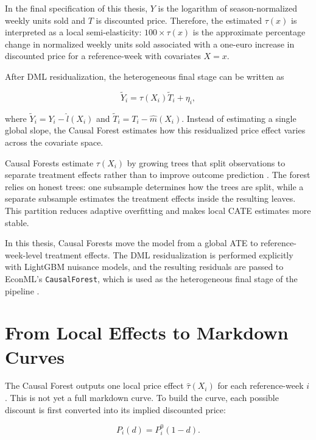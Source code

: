 In the final specification of this thesis, $Y$ is the logarithm of season-normalized weekly units sold and $T$ is discounted price. Therefore, the estimated $\tau(x)$ is interpreted as a local semi-elasticity: $100\times\tau(x)$ is the approximate percentage change in normalized weekly units sold associated with a one-euro increase in discounted price for a reference-week with covariates $X=x$.

After DML residualization, the heterogeneous final stage can be written as

\begin{equation}
\tilde{Y}_i=\tau(X_i)\tilde{T}_i+\eta_i,
\end{equation}

where $\tilde{Y}_i=Y_i-\hat{l}(X_i)$ and $\tilde{T}_i=T_i-\hat{m}(X_i)$. Instead of estimating a single global slope, the Causal Forest estimates how this residualized price effect varies across the covariate space.

Causal Forests estimate $\tau(X_i)$ by growing trees that split observations to separate treatment effects rather than to improve outcome prediction \cite{wager2018hteforest,athey2019causalforests,athey2019grf}. The forest relies on honest trees: one subsample determines how the trees are split, while a separate subsample estimates the treatment effects inside the resulting leaves. This partition reduces adaptive overfitting and makes local CATE estimates more stable.

In this thesis, Causal Forests move the model from a global ATE to reference-week-level treatment effects. The DML residualization is performed explicitly with LightGBM nuisance models, and the resulting residuals are passed to EconML's \texttt{CausalForest}, which is used as the heterogeneous final stage of the pipeline \cite{battocchi2019econml,oprescu2019orf,syrgkanis2021econml}.

\section{From Local Effects to Markdown Curves}
\label{sec:local-effects-markdown-curves}

The Causal Forest outputs one local price effect $\hat{\tau}(X_i)$ for each reference-week $i$. This is not yet a full markdown curve. To build the curve, each possible discount is first converted into its implied discounted price:

\begin{equation}
P_i(d)=P_i^{0}(1-d).
\end{equation}

